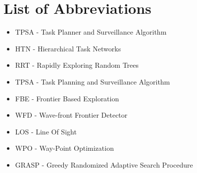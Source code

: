 \chapter{List of Abbreviations}
%
\begin{itemize}
     \item
        TPSA - Task Planner and Surveillance Algorithm
    
    \item
       HTN - Hierarchical Task Networks
    \item 
       RRT - Rapidly Exploring Random Trees
    \item
       TPSA - Task Planning and Surveillance Algorithm
    \item
       FBE - Frontier Based Exploration
    \item
       WFD - Wave-front Frontier Detector 
    \item
       LOS - Line Of Sight
    \item 
       WPO - Way-Point Optimization
    \item 
       GRASP - Greedy Randomized Adaptive Search Procedure 
    
    
\end{itemize}






